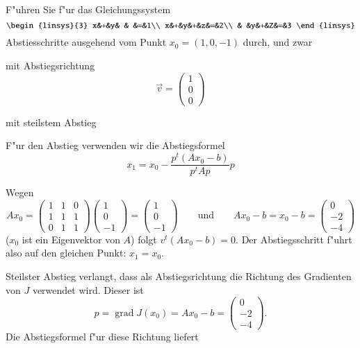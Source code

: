 F"uhren Sie f"ur das Gleichungssystem
\[
\begin{linsys}{3}
x&+&y& & &=&1\\
x&+&y&+&z&=&2\\
 & &y&+&Z&=&3
\end{linsys}
\]
Abstiesschritte ausgehend vom Punkt $x_0=(1,0,-1)$ durch, und zwar
\begin{teilaufgaben}
\item
mit Abstiegsrichtung
\[
\vec v=\begin{pmatrix}1\\0\\0\end{pmatrix}
\]
\item
mit steilstem Abstieg
\end{teilaufgaben}

\begin{loesung}
F"ur den Abstieg verwenden wir die Abstiegsformel
\[
x_1=x_0-\frac{p^t(Ax_0-b)}{p^tAp}p
\]
\begin{teilaufgaben}
\item
Wegen
\[
Ax_0=
\begin{pmatrix}
1&1&0\\
1&1&1\\
0&1&1
\end{pmatrix}
\begin{pmatrix}
1\\0\\-1
\end{pmatrix}
=
\begin{pmatrix}1\\0\\-1\end{pmatrix}
\qquad
\text{und}
\qquad
Ax_0-b
=
x_0-b
=
\begin{pmatrix}
0\\-2\\-4
\end{pmatrix}
\]
($x_0$ ist ein Eigenvektor von $A$) folgt
$v^t(Ax_0-b)=0$.
Der Abstiegsschritt f"uhrt also auf den gleichen Punkt: $x_1=x_0$.
\item
Steilster Abstieg verlangt, dass als Abstiegsrichtung die Richtung des
Gradienten von $J$ verwendet wird. 
Dieser ist
\[
p=\operatorname{grad}J(x_0)=Ax_0-b=\begin{pmatrix}0\\-2\\-4\end{pmatrix}.
\]
Die Abstiegsformel f"ur diese Richtung liefert
\begin{align*}

\end{align*}
\end{teilaufgaben}
\end{loesung}
